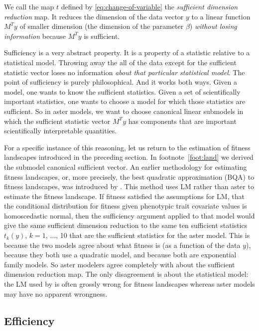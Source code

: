 \documentclass[11pt]{article}
\begin{document}
We call the map $t$ defined by \eqref{eq:change-of-variable} the
\emph{sufficient dimension reduction} map.  It reduces the dimension of the
data vector $y$ to a linear function $M^T y$ of smaller dimension
(the dimension of the parameter $\beta$) \emph{without losing information}
because $M^T y$ is sufficient.

Sufficiency is a very abstract property.  It is a property of a statistic
relative to a statistical model.  Throwing away the all of the data except
for the sufficient statistic vector loses no information \emph{about that
particular statistical model}.  The point of sufficiency is purely
philosophical.  And it works both ways.  Given a model, one wants to know
the sufficient statistics.  Given a set of scientifically important statistics,
one wants to choose a model for which those statistics are sufficient.  So
in aster models, we want to choose canonical linear submodels in which the
sufficient statistic vector $M^T y$ has components that are important
scientifically interpretable quantities.

For a specific instance of this reasoning, let us return to the estimation
of fitness landscapes introduced in the preceding section.
In footnote~\ref{foot:land} we derived the submodel canonical sufficient
vector.  An earlier methodology for estimating fitness landscapes, or, more
precisely, the best quadratic approximation (BQA) to fitness landscapes, was
introduced by \citet{lande-arnold}.  This method uses LM rather than aster to estimate
the fitness landscape.  If fitness satisfied the assumptions for LM, that
the conditional distribution for fitness given phenotypic trait covariate
values is homoscedastic normal, then the sufficiency argument applied to that
model would give the same sufficient dimension reduction to the same ten
sufficient statistics $t_k(y)$, $k = 1$, $\ldots$, 10 that are the sufficient
statistics for the aster model.  This is because the two models agree about
what fitness is (as a function of the data $y$), because they both use
a quadratic model, and because both are exponential family models.
So aster modelers agree completely with \citet{lande-arnold} about the sufficient
dimension reduction map.  The only disagreement is about the statistical model:
the LM used by \citet{lande-arnold} is often grossly wrong for fitness landscapes
whereas aster models may have no apparent wrongness.

\subsection{Efficiency} \label{sec:efficiency}
\end{document}
